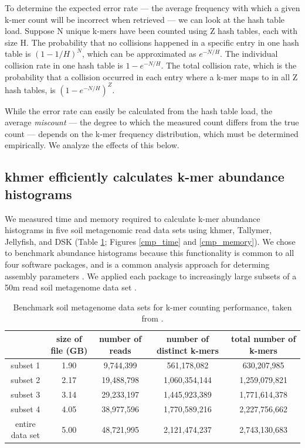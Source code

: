 \documentclass{article}
\begin{document}
To determine the expected error rate --- the average frequency
with which a given k-mer count will be incorrect when retrieved --- we
can look at the hash table load. Suppose N unique k-mers have been
counted using Z hash tables, each with size H.  The probability that
no collisions happened in a specific entry in one hash table is
$(1-1/H)^{N}$, which can be approximated as $e^{-N/H}$. The individual
collision rate in one hash table is $1-e^{-N/H}$. The total collision
rate, which is the probability that a collision occurred in each entry
where a k-mer maps to in all Z hash tables, is $(1-e^{-N/H})^{Z}$.

While the error rate can easily be calculated from the hash
table load, the average {\em miscount} --- the degree to which the measured count
differs from the true count --- depends on the k-mer frequency
distribution, which must be determined empirically.  We analyze the
effects of this below.

\subsection{khmer efficiently calculates k-mer abundance histograms}

We measured time and memory required to calculate k-mer abundance
histograms in five soil metagenomic read data sets using khmer,
Tallymer, Jellyfish, and DSK (Table \ref{table:datasets}; Figures \ref{cmp_time} and
\ref{cmp_memory}).  We chose to benchmark abundance histograms because
this functionality is common to all four software packages, and is a
common analysis approach for determing assembly parameters \cite{Chikhi2013}.
We applied each package to increasingly large subsets of a 50m read soil
metagenome data set \cite{Howe2012}.

\begin{table}[ht]
    \begin{tabular}{ |c | c |c| c|c| }
      \hline                        
       & size of file (GB) & number of reads & number of distinct
      k-mers & total number of k-mers \\
      \hline
    subset 1 & 1.90 & 9,744,399 & 561,178,082 & 630,207,985
    \\
    subset 2 & 2.17 & 19,488,798 & 1,060,354,144 & 1,259,079,821
    \\ 
    subset 3 & 3.14 & 29,233,197 & 1,445,923,389 & 1,771,614,378
    \\ 
    subset 4 & 4.05 & 38,977,596 & 1,770,589,216 & 2,227,756,662
    \\ 
    entire data set & 5.00 & 48,721,995 & 2,121,474,237 & 2,743,130,683
    \\
      \hline  
    \end{tabular}
\caption{Benchmark soil metagenome data sets for k-mer counting performance, taken from
\cite{Howe2012}.}
\label{table:datasets}
\end{table}
\end{document}
